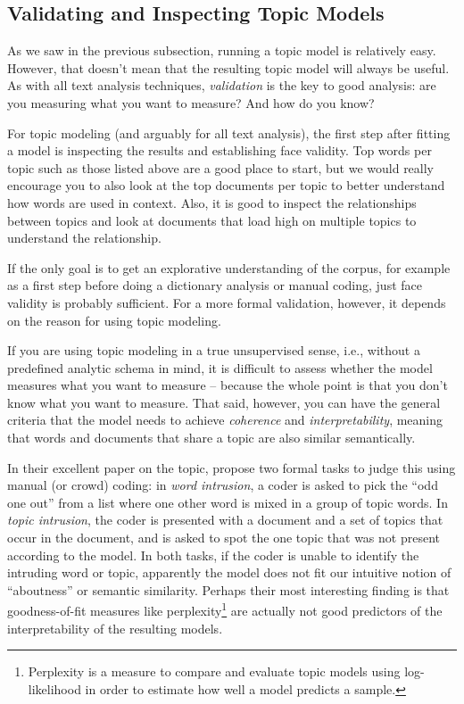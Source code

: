 \subsection{Validating and Inspecting Topic Models}

As we saw in the previous subsection, running a topic model is relatively easy.
However, that doesn't mean that the resulting topic model will always be useful.
As with all text analysis techniques, \emph{validation} is the key to good analysis:
are you measuring what you want to measure? And how do you know?

For topic modeling (and arguably for all text analysis),
the first step after fitting a model is inspecting the results and establishing face validity.
Top words per topic such as those listed above are a good place to start,
but we would really encourage you to also look at the top documents per topic to better understand how words are used in context.
Also, it is good to inspect the relationships between topics and look at documents that load high on multiple topics to understand the relationship.

If the only goal is to get an explorative understanding of the corpus,
for example as a first step before doing a dictionary analysis or manual coding,
just face validity is probably sufficient.
For a more formal validation, however, it depends on the reason for using topic modeling.

If you are using topic modeling in a true unsupervised sense, i.e., without a predefined analytic schema in mind,
it is difficult to assess whether the model measures what you want to measure --
because the whole point is that you don't know what you want to measure.
That said, however, you can have the general criteria that the model needs to achieve \emph{coherence}
and \emph{interpretability}, meaning that words and documents that share a topic
are also similar semantically.

In their excellent paper on the topic, \citet{chang09} propose two formal tasks to judge this
using manual (or crowd) coding: in \emph{word intrusion}, a coder is asked to pick the ``odd one out'' from a list
where one other word is mixed in a group of topic words.
In \emph{topic intrusion}, the coder is presented with a document and a set of topics that occur in the document,
and is asked to spot the one topic that was not present according to the model.
In both tasks, if the coder is unable to identify the intruding word or topic, apparently the model does not fit
our intuitive notion of ``aboutness'' or semantic similarity.
Perhaps their most interesting finding is that goodness-of-fit measures like perplexity\footnote{Perplexity is a measure to compare and evaluate topic models using log-likelihood in order to estimate how well a model predicts a sample.}
are actually not good predictors of the interpretability of the resulting models.

